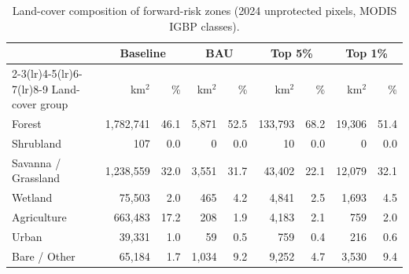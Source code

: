 \begin{table}[htbp]
  \centering
  \small
  \caption{Land-cover composition of forward-risk zones (2024 unprotected pixels, MODIS IGBP classes).}
  \label{tab:landcover_exposure}
  \begin{tabular}{lrrrrrrrr}
    \toprule
    & \multicolumn{2}{c}{Baseline} & \multicolumn{2}{c}{BAU} & \multicolumn{2}{c}{Top 5\%} & \multicolumn{2}{c}{Top 1\%} \\
    \cmidrule(lr){2-3}\cmidrule(lr){4-5}\cmidrule(lr){6-7}\cmidrule(lr){8-9}
    Land-cover group & km$^2$ & \% & km$^2$ & \% & km$^2$ & \% & km$^2$ & \% \\
    \midrule
    Forest & 1,782,741 & 46.1 & 5,871 & 52.5 & 133,793 & 68.2 & 19,306 & 51.4 \\
    Shrubland & 107 & 0.0 & 0 & 0.0 & 10 & 0.0 & 0 & 0.0 \\
    Savanna / Grassland & 1,238,559 & 32.0 & 3,551 & 31.7 & 43,402 & 22.1 & 12,079 & 32.1 \\
    Wetland & 75,503 & 2.0 & 465 & 4.2 & 4,841 & 2.5 & 1,693 & 4.5 \\
    Agriculture & 663,483 & 17.2 & 208 & 1.9 & 4,183 & 2.1 & 759 & 2.0 \\
    Urban & 39,331 & 1.0 & 59 & 0.5 & 759 & 0.4 & 216 & 0.6 \\
    Bare / Other & 65,184 & 1.7 & 1,034 & 9.2 & 9,252 & 4.7 & 3,530 & 9.4 \\
    \bottomrule
  \end{tabular}
\end{table}
